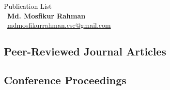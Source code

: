 \documentclass[a4paper, 12pt]{article}
\begin{document}
\begin{center}
    {\Huge Publication List} \\[7.5pt]
    \faUser \, \textbf{Md. Mosfikur Rahman} \\[0.2cm]
    \faEnvelope \, \href{mailto:mdmosfikurrahman.cse@gmail.com}{mdmosfikurrahman.cse@gmail.com}
\end{center}

\vspace{0cm}

\begin{refsegment}
  \nocite{*}
  \section*{Peer-Reviewed Journal Articles}
  \printbibliography[
    heading=none,
    type=article,
    segment=\therefsegment,
    resetnumbers=true
  ]
\end{refsegment}


\begin{refsegment}
  \nocite{*}
  \section*{Conference Proceedings}
  \printbibliography[
    heading=none,
    type=inproceedings,
    segment=\therefsegment,
    resetnumbers=true
  ]
\end{refsegment}
\end{document}
